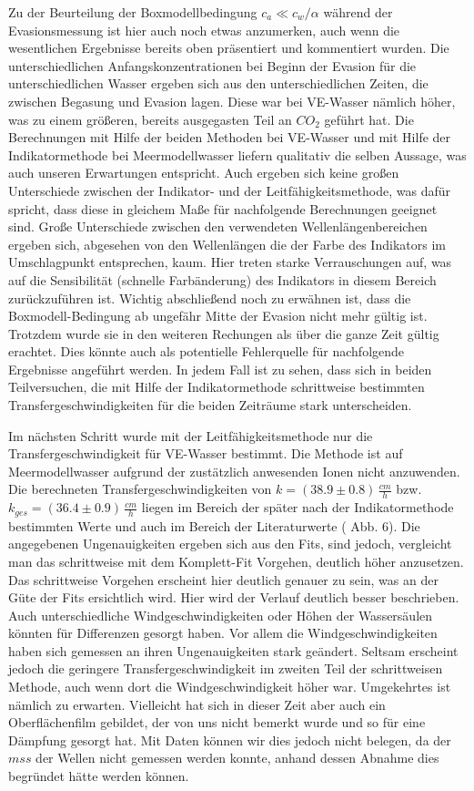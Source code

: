 \documentclass[12pt]{article}
\begin{document}
Zu der Beurteilung der Boxmodellbedingung $c_a \ll c_w/\alpha $ während der Evasionsmessung ist hier auch noch etwas anzumerken, auch wenn die wesentlichen Ergebnisse bereits oben präsentiert und kommentiert wurden. Die unterschiedlichen Anfangskonzentrationen bei Beginn der Evasion für die unterschiedlichen Wasser ergeben sich aus den unterschiedlichen Zeiten, die zwischen Begasung und Evasion lagen. Diese war bei VE-Wasser nämlich höher, was zu einem größeren, bereits ausgegasten Teil an $CO_2$ geführt hat. Die Berechnungen mit Hilfe der beiden Methoden bei VE-Wasser und mit Hilfe der Indikatormethode bei Meermodellwasser liefern qualitativ die selben Aussage, was auch unseren Erwartungen entspricht. Auch ergeben sich keine großen Unterschiede zwischen der Indikator- und der Leitfähigkeitsmethode, was dafür spricht, dass diese in gleichem Maße für nachfolgende Berechnungen geeignet sind. Große Unterschiede zwischen den verwendeten Wellenlängenbereichen ergeben sich, abgesehen von den Wellenlängen die der Farbe des Indikators im Umschlagpunkt entsprechen, kaum. Hier treten starke Verrauschungen auf, was auf die Sensibilität (schnelle Farbänderung) des Indikators in diesem Bereich zurückzuführen ist. Wichtig abschließend noch zu erwähnen ist, dass die Boxmodell-Bedingung ab ungefähr Mitte der Evasion nicht mehr gültig ist. Trotzdem wurde sie in den weiteren Rechungen als über die ganze Zeit gültig erachtet. Dies könnte auch als potentielle Fehlerquelle für nachfolgende Ergebnisse angeführt werden. In jedem Fall ist zu sehen, dass sich in beiden Teilversuchen, die mit Hilfe der Indikatormethode schrittweise bestimmten Transfergeschwindigkeiten für die beiden Zeiträume stark unterscheiden. 

Im nächsten Schritt wurde mit der Leitfähigkeitsmethode nur die Transfergeschwindigkeit für VE-Wasser bestimmt. Die Methode ist auf Meermodellwasser aufgrund der zustätzlich anwesenden Ionen nicht anzuwenden. Die berechneten Transfergeschwindigkeiten von $k = (38.9 \pm 0.8)\, \frac{cm}{h}$ bzw. $k_{ges} = (36.4 \pm 0.9)\, \frac{cm}{h}$ liegen im Bereich der später nach der Indikatormethode bestimmten Werte und auch im Bereich der Literaturwerte (\cite{jaehne} Abb. 6). Die angegebenen Ungenauigkeiten ergeben sich aus den Fits, sind jedoch, vergleicht man das schrittweise mit dem Komplett-Fit Vorgehen, deutlich höher anzusetzen. Das schrittweise Vorgehen erscheint hier deutlich genauer zu sein, was an der Güte der Fits ersichtlich wird. Hier wird der Verlauf deutlich besser beschrieben. Auch unterschiedliche Windgeschwindigkeiten oder Höhen der Wassersäulen könnten für Differenzen gesorgt haben. Vor allem die Windgeschwindigkeiten haben sich gemessen an ihren Ungenauigkeiten stark geändert. Seltsam erscheint jedoch die geringere Transfergeschwindigkeit im zweiten Teil der schrittweisen Methode, auch wenn dort die Windgeschwindigkeit höher war. Umgekehrtes ist nämlich zu erwarten. Vielleicht hat sich in dieser Zeit aber auch ein Oberflächenfilm gebildet, der von uns nicht bemerkt wurde und so für eine Dämpfung gesorgt hat. Mit Daten können wir dies jedoch nicht belegen, da der $mss$ der Wellen nicht gemessen werden konnte, anhand dessen Abnahme dies begründet hätte werden können.
\end{document}
